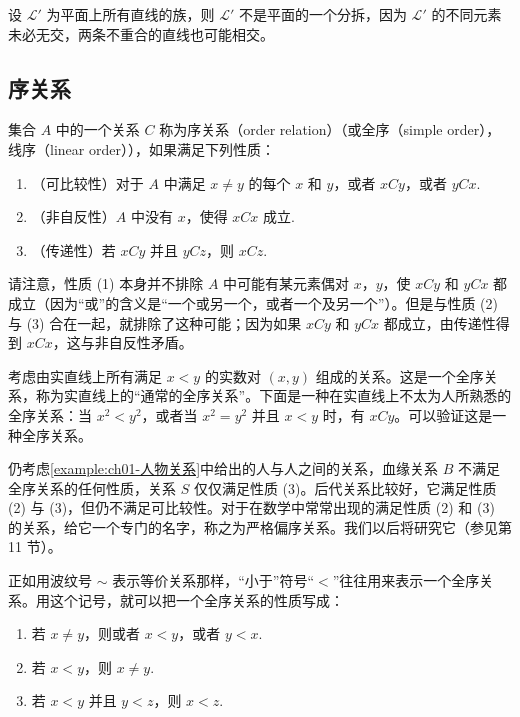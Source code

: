 \documentclass[../../main.tex]{subfiles}
\begin{document}
\begin{example}\label{example:ch01-非分拆线族}
设 $\mathcal{L}'$ 为平面上所有直线的族，则 $\mathcal{L}'$ 不是平面的一个分拆，因为 $\mathcal{L}'$ 的不同元素未必无交，两条不重合的直线也可能相交。
\end{example}

\subsection*{序关系}

集合 $A$ 中的一个关系 $C$ 称为序关系（order relation）（或全序（simple order），线序（linear order）），如果满足下列性质：
\begin{enumerate}[(1)]
\item（可比较性）对于 $A$ 中满足 $x \neq y$ 的每个 $x$ 和 $y$，或者 $xCy$，或者 $yCx$.
\item（非自反性）$A$ 中没有 $x$，使得 $xCx$ 成立.
\item（传递性）若 $xCy$ 并且 $yCz$，则 $xCz$.
\end{enumerate}

请注意，性质 (1) 本身并不排除 $A$ 中可能有某元素偶对 $x$，$y$，使 $xCy$ 和 $yCx$ 都成立（因为“或”的含义是“一个或另一个，或者一个及另一个”）。但是与性质 (2) 与 (3) 合在一起，就排除了这种可能；因为如果 $xCy$ 和 $yCx$ 都成立，由传递性得到 $xCx$，这与非自反性矛盾。

\begin{example}\label{example:ch01-通常全序}
考虑由实直线上所有满足 $x < y$ 的实数对 $(x, y)$ 组成的关系。这是一个全序关系，称为实直线上的“通常的全序关系”。下面是一种在实直线上不太为人所熟悉的全序关系：当 $x^{2} < y^{2}$，或者当 $x^{2} = y^{2}$ 并且 $x < y$ 时，有 $xCy$。可以验证这是一种全序关系。
\end{example}

\begin{example}\label{example:ch01-人物关系序}
仍考虑\cref{example:ch01-人物关系}中给出的人与人之间的关系，血缘关系 $B$ 不满足全序关系的任何性质，关系 $S$ 仅仅满足性质 (3)。后代关系比较好，它满足性质 (2) 与 (3)，但仍不满足可比较性。对于在数学中常常出现的满足性质 (2) 和 (3) 的关系，给它一个专门的名字，称之为严格偏序关系。我们以后将研究它（参见第 11 节）。
\end{example}

正如用波纹号 $\sim$ 表示等价关系那样，“小于”符号“$<$”往往用来表示一个全序关系。用这个记号，就可以把一个全序关系的性质写成：
\begin{enumerate}[(1)]
\item 若 $x \neq y$，则或者 $x < y$，或者 $y < x$.
\item 若 $x < y$，则 $x \neq y$.
\item 若 $x < y$ 并且 $y < z$，则 $x < z$.
\end{enumerate}
\end{document}
